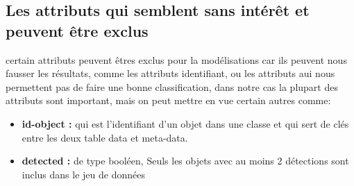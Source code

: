 \subsection{Les attributs qui semblent sans intérêt et peuvent être exclus}
certain attributs peuvent êtres exclus pour la modélisations car ils peuvent nous fausser les résultats, comme les attributs identifiant, ou les attributs aui nous permettent pas de faire une bonne classification, dans notre cas la plupart des attributs sont important, mais on peut mettre en vue certain autres comme:
\begin{itemize}
    \item \textbf {id-object : } qui est l'identifiant d'un objet dans une classe et qui sert de clés entre les deux table data et meta-data.
    \item \textbf {detected : } de type booléen, Seuls les objets avec au moins 2 détections sont inclus dans le jeu de données 
\end{itemize}
    

